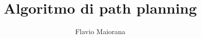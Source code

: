 \documentclass[12pt,handout]{beamer}
\title{Algoritmo di path planning}
\author{Flavio Maiorana}
\begin{document}
\frame{\titlepage}
\end{document}
